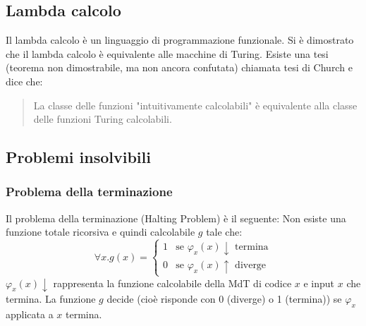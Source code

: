 \documentclass[a4paper]{article}
\begin{document}
\subsection{Lambda calcolo}
Il lambda calcolo è un linguaggio di programmazione funzionale. Si è dimostrato che
il lambda calcolo è equivalente alle macchine di Turing.
Esiste una tesi (teorema non dimostrabile, ma non ancora confutata) chiamata tesi di Church
e dice che:
\begin{quote}
  La classe delle funzioni "intuitivamente calcolabili" è equivalente alla classe
  delle funzioni Turing calcolabili.
\end{quote}

\subsection{Problemi insolvibili}
\subsubsection{Problema della terminazione}
Il problema della terminazione (Halting Problem) è il seguente:
Non esiste una funzione totale ricorsiva e quindi calcolabile \( g \) tale che:
\[
  \forall x. g(x) =
  \begin{cases}
    1 & \text{se } \varphi_x(x) \downarrow \text{ termina} \\
    0 & \text{se } \varphi_x(x) \uparrow \text{ diverge}
  \end{cases}
\] 
\( \varphi_x(x) \downarrow \) rappresenta la funzione calcolabile della MdT di codice \( x \) 
e input \( x \) che termina.
La funzione \( g \) decide (cioè risponde con 0 (diverge) o 1 (termina)) se \( \varphi_x \) 
applicata a \( x \) termina.
\end{document}
